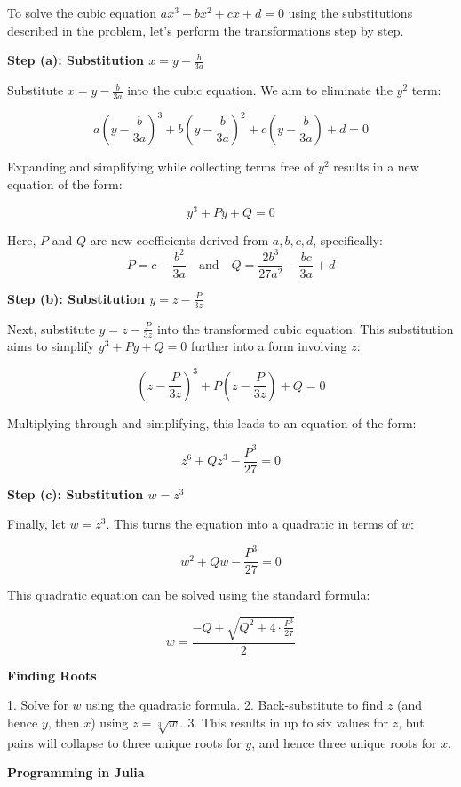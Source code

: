 \documentclass[8pt]{article}
\begin{document}
To solve the cubic equation \(ax^3 + bx^2 + cx + d = 0\) using the substitutions described in the problem, let's perform the transformations step by step.

\textbf{Step (a): Substitution \(x = y - \frac{b}{3a}\)}

Substitute \(x = y - \frac{b}{3a}\) into the cubic equation. We aim to eliminate the \(y^2\) term:

\[
a\left(y - \frac{b}{3a}\right)^3 + b\left(y - \frac{b}{3a}\right)^2 + c\left(y - \frac{b}{3a}\right) + d = 0
\]

Expanding and simplifying while collecting terms free of \(y^2\) results in a new equation of the form:

\[
y^3 + Py + Q = 0
\]

Here, \(P\) and \(Q\) are new coefficients derived from \(a, b, c, d\), specifically:
\[
P = c - \frac{b^2}{3a} \quad \text{and} \quad Q = \frac{2b^3}{27a^2} - \frac{bc}{3a} + d
\]

\textbf{Step (b): Substitution \(y = z - \frac{P}{3z}\)}

Next, substitute \(y = z - \frac{P}{3z}\) into the transformed cubic equation. This substitution aims to simplify \(y^3 + Py + Q = 0\) further into a form involving \(z\):

\[
\left(z - \frac{P}{3z}\right)^3 + P\left(z - \frac{P}{3z}\right) + Q = 0
\]

Multiplying through and simplifying, this leads to an equation of the form:

\[
z^6 + Qz^3 - \frac{P^3}{27} = 0
\]

\textbf{Step (c): Substitution \(w = z^3\)}

Finally, let \(w = z^3\). This turns the equation into a quadratic in terms of \(w\):

\[
w^2 + Qw - \frac{P^3}{27} = 0
\]

This quadratic equation can be solved using the standard formula:

\[
w = \frac{-Q \pm \sqrt{Q^2 + 4 \cdot \frac{P^3}{27}}}{2}
\]

\textbf{Finding Roots}

1. Solve for \(w\) using the quadratic formula.
2. Back-substitute to find \(z\) (and hence \(y\), then \(x\)) using \(z = \sqrt[3]{w}\).
3. This results in up to six values for \(z\), but pairs will collapse to three unique roots for \(y\), and hence three unique roots for \(x\).

\textbf{Programming in Julia}
\end{document}
